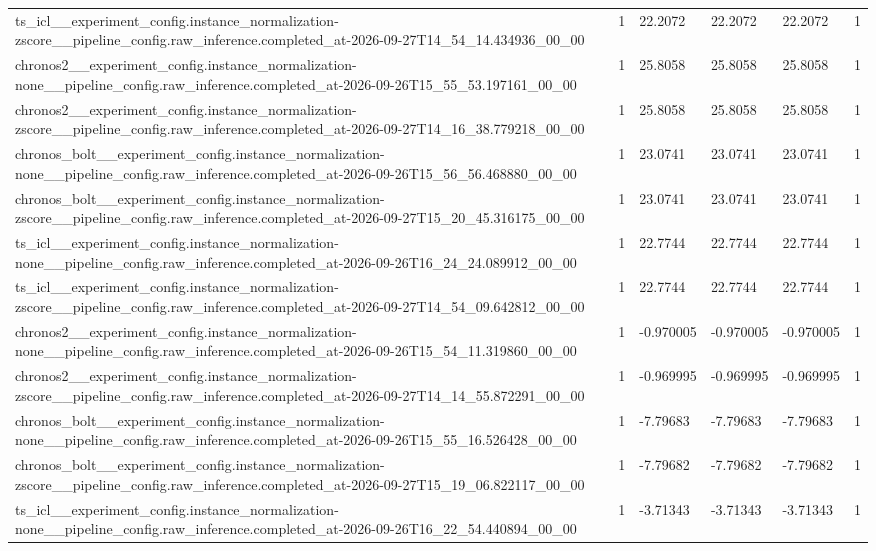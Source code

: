 \begin{tabular}{llllll}
ts\_icl\_\_experiment\_config.instance\_normalization-zscore\_\_pipeline\_config.raw\_inference.completed\_at-2026-09-27T14\_54\_14.434936\_00\_00 & 1 & 22.2072 & 22.2072 & 22.2072 & 1 \\
chronos2\_\_experiment\_config.instance\_normalization-none\_\_pipeline\_config.raw\_inference.completed\_at-2026-09-26T15\_55\_53.197161\_00\_00 & 1 & 25.8058 & 25.8058 & 25.8058 & 1 \\
chronos2\_\_experiment\_config.instance\_normalization-zscore\_\_pipeline\_config.raw\_inference.completed\_at-2026-09-27T14\_16\_38.779218\_00\_00 & 1 & 25.8058 & 25.8058 & 25.8058 & 1 \\
chronos\_bolt\_\_experiment\_config.instance\_normalization-none\_\_pipeline\_config.raw\_inference.completed\_at-2026-09-26T15\_56\_56.468880\_00\_00 & 1 & 23.0741 & 23.0741 & 23.0741 & 1 \\
chronos\_bolt\_\_experiment\_config.instance\_normalization-zscore\_\_pipeline\_config.raw\_inference.completed\_at-2026-09-27T15\_20\_45.316175\_00\_00 & 1 & 23.0741 & 23.0741 & 23.0741 & 1 \\
ts\_icl\_\_experiment\_config.instance\_normalization-none\_\_pipeline\_config.raw\_inference.completed\_at-2026-09-26T16\_24\_24.089912\_00\_00 & 1 & 22.7744 & 22.7744 & 22.7744 & 1 \\
ts\_icl\_\_experiment\_config.instance\_normalization-zscore\_\_pipeline\_config.raw\_inference.completed\_at-2026-09-27T14\_54\_09.642812\_00\_00 & 1 & 22.7744 & 22.7744 & 22.7744 & 1 \\
chronos2\_\_experiment\_config.instance\_normalization-none\_\_pipeline\_config.raw\_inference.completed\_at-2026-09-26T15\_54\_11.319860\_00\_00 & 1 & -0.970005 & -0.970005 & -0.970005 & 1 \\
chronos2\_\_experiment\_config.instance\_normalization-zscore\_\_pipeline\_config.raw\_inference.completed\_at-2026-09-27T14\_14\_55.872291\_00\_00 & 1 & -0.969995 & -0.969995 & -0.969995 & 1 \\
chronos\_bolt\_\_experiment\_config.instance\_normalization-none\_\_pipeline\_config.raw\_inference.completed\_at-2026-09-26T15\_55\_16.526428\_00\_00 & 1 & -7.79683 & -7.79683 & -7.79683 & 1 \\
chronos\_bolt\_\_experiment\_config.instance\_normalization-zscore\_\_pipeline\_config.raw\_inference.completed\_at-2026-09-27T15\_19\_06.822117\_00\_00 & 1 & -7.79682 & -7.79682 & -7.79682 & 1 \\
ts\_icl\_\_experiment\_config.instance\_normalization-none\_\_pipeline\_config.raw\_inference.completed\_at-2026-09-26T16\_22\_54.440894\_00\_00 & 1 & -3.71343 & -3.71343 & -3.71343 & 1 \\

\end{tabular}
